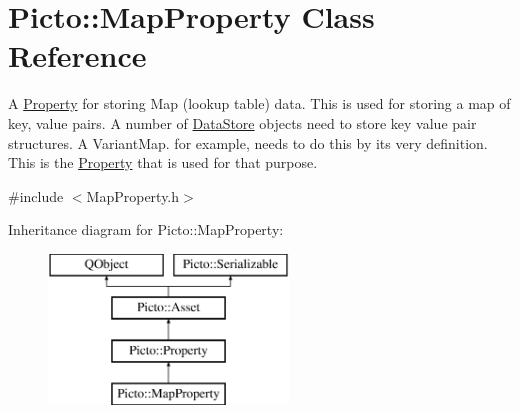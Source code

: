 \hypertarget{class_picto_1_1_map_property}{\section{Picto\-:\-:Map\-Property Class Reference}
\label{class_picto_1_1_map_property}
}


A \hyperlink{class_picto_1_1_property}{Property} for storing Map (lookup table) data. This is used for storing a map of key, value pairs. A number of \hyperlink{class_picto_1_1_data_store}{Data\-Store} objects need to store key value pair structures. A Variant\-Map. for example, needs to do this by its very definition. This is the \hyperlink{class_picto_1_1_property}{Property} that is used for that purpose.  




{\ttfamily \#include $<$Map\-Property.\-h$>$}

Inheritance diagram for Picto\-:\-:Map\-Property\-:\begin{figure}[H]
\begin{center}
\leavevmode
\includegraphics[height=4.000000cm]{class_picto_1_1_map_property}
\end{center}
\end{figure}
